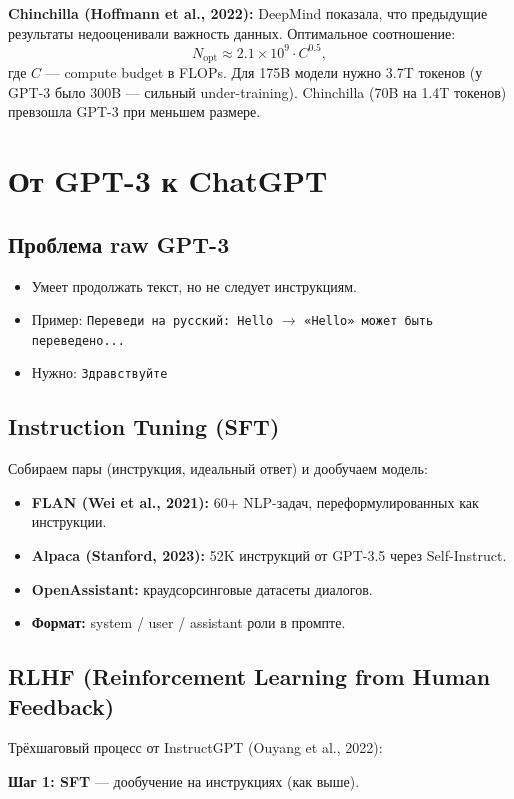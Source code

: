 \documentclass[a4paper,12pt]{article}
\begin{document}
\textbf{Chinchilla (Hoffmann et al., 2022):} DeepMind показала, что предыдущие результаты недооценивали важность данных. Оптимальное соотношение:
\[
N_{\text{opt}} \approx 2.1 \times 10^{9} \cdot C^{0.5},
\]
где $C$ --- compute budget в FLOPs. Для 175B модели нужно 3.7T токенов (у GPT-3 было 300B --- сильный under-training). Chinchilla (70B на 1.4T токенов) превзошла GPT-3 при меньшем размере.

\section{От GPT-3 к ChatGPT}

\subsection{Проблема raw GPT-3}
\begin{itemize}
    \item Умеет продолжать текст, но не следует инструкциям.
    \item Пример: \texttt{Переведи на русский: Hello} $\to$ \texttt{«Hello» может быть переведено...}
    \item Нужно: \texttt{Здравствуйте}
\end{itemize}

\subsection{Instruction Tuning (SFT)}
Собираем пары (инструкция, идеальный ответ) и дообучаем модель:
\begin{itemize}
    \item \textbf{FLAN (Wei et al., 2021):} 60+ NLP-задач, переформулированных как инструкции.
    \item \textbf{Alpaca (Stanford, 2023):} 52K инструкций от GPT-3.5 через Self-Instruct.
    \item \textbf{OpenAssistant:} краудсорсинговые датасеты диалогов.
    \item \textbf{Формат:} system / user / assistant роли в промпте.
\end{itemize}

\subsection{RLHF (Reinforcement Learning from Human Feedback)}
Трёхшаговый процесс от InstructGPT (Ouyang et al., 2022):

\textbf{Шаг 1: SFT} --- дообучение на инструкциях (как выше).
\end{document}
